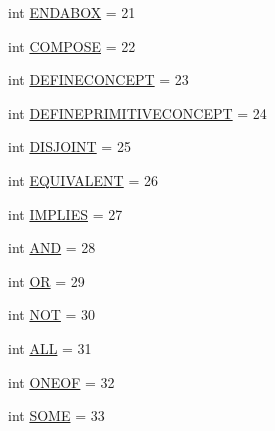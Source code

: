 \begin{DoxyCompactItemize}
int \hyperlink{interfacede_1_1uulm_1_1ecs_1_1ai_1_1owlapi_1_1krssparser_1_1_k_r_s_s2_parser_constants_aace3ce995274af0cdbf33263b1b92438}{E\-N\-D\-A\-B\-O\-X} = 21
\item 
int \hyperlink{interfacede_1_1uulm_1_1ecs_1_1ai_1_1owlapi_1_1krssparser_1_1_k_r_s_s2_parser_constants_a2f2d4e371d65330e749a2da9570e7d2c}{C\-O\-M\-P\-O\-S\-E} = 22
\item 
int \hyperlink{interfacede_1_1uulm_1_1ecs_1_1ai_1_1owlapi_1_1krssparser_1_1_k_r_s_s2_parser_constants_ac48665c575da57708e79bc91f9211f52}{D\-E\-F\-I\-N\-E\-C\-O\-N\-C\-E\-P\-T} = 23
\item 
int \hyperlink{interfacede_1_1uulm_1_1ecs_1_1ai_1_1owlapi_1_1krssparser_1_1_k_r_s_s2_parser_constants_a61e192c744715a136cdc4ef4ca5de7b2}{D\-E\-F\-I\-N\-E\-P\-R\-I\-M\-I\-T\-I\-V\-E\-C\-O\-N\-C\-E\-P\-T} = 24
\item 
int \hyperlink{interfacede_1_1uulm_1_1ecs_1_1ai_1_1owlapi_1_1krssparser_1_1_k_r_s_s2_parser_constants_a56cfaa2c541b6267df38c3786d0abf62}{D\-I\-S\-J\-O\-I\-N\-T} = 25
\item 
int \hyperlink{interfacede_1_1uulm_1_1ecs_1_1ai_1_1owlapi_1_1krssparser_1_1_k_r_s_s2_parser_constants_a09c4c2f67e2de2a09f5a17e674b74305}{E\-Q\-U\-I\-V\-A\-L\-E\-N\-T} = 26
\item 
int \hyperlink{interfacede_1_1uulm_1_1ecs_1_1ai_1_1owlapi_1_1krssparser_1_1_k_r_s_s2_parser_constants_a5af23d8e32d5e67b196257055cbd6d42}{I\-M\-P\-L\-I\-E\-S} = 27
\item 
int \hyperlink{interfacede_1_1uulm_1_1ecs_1_1ai_1_1owlapi_1_1krssparser_1_1_k_r_s_s2_parser_constants_aff0d1949213c239a2ce92d04bc515be5}{A\-N\-D} = 28
\item 
int \hyperlink{interfacede_1_1uulm_1_1ecs_1_1ai_1_1owlapi_1_1krssparser_1_1_k_r_s_s2_parser_constants_abc2eabb262973e1fa5d4bfd436606d90}{O\-R} = 29
\item 
int \hyperlink{interfacede_1_1uulm_1_1ecs_1_1ai_1_1owlapi_1_1krssparser_1_1_k_r_s_s2_parser_constants_a37a7a6163660394c69bec7b360ae234b}{N\-O\-T} = 30
\item 
int \hyperlink{interfacede_1_1uulm_1_1ecs_1_1ai_1_1owlapi_1_1krssparser_1_1_k_r_s_s2_parser_constants_a721fb7b9356d87b6dc5a81eea4f9fc50}{A\-L\-L} = 31
\item 
int \hyperlink{interfacede_1_1uulm_1_1ecs_1_1ai_1_1owlapi_1_1krssparser_1_1_k_r_s_s2_parser_constants_a03bc817f5da353d0bebe4bc217cde9dc}{O\-N\-E\-O\-F} = 32
\item 
int \hyperlink{interfacede_1_1uulm_1_1ecs_1_1ai_1_1owlapi_1_1krssparser_1_1_k_r_s_s2_parser_constants_ae4aa752738c0940c0a1cf4b6f20dd600}{S\-O\-M\-E} = 33

\end{DoxyCompactItemize}
